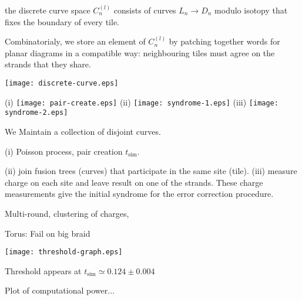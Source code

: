 \documentclass[11pt,a4paper]{article}
\begin{document}
 the discrete curve space $C_n^{(l)}$ consists of
curves $L_n\to D_n$ modulo isotopy that fixes the boundary of
every tile.

Combinatorialy, we store an element of $C_n^{(l)}$ by patching
together words for planar diagrams in a compatible way: 
neighbouring tiles must agree on the strands that they share.

\begin{center}
\texttt{[image: discrete-curve.eps]}
\end{center}



\begin{center}
(i)
\texttt{[image: pair-create.eps]}
\hskip 10pt
(ii)
\texttt{[image: syndrome-1.eps]}
\hskip 10pt
(iii)
\texttt{[image: syndrome-2.eps]}
\end{center}

We Maintain a collection of disjoint curves.

(i) Poisson process, pair creation $t_{\mathrm{sim}}$.

(ii) join fusion trees (curves)
that participate in the same site (tile).
(iii) measure charge on each site and leave result on
one of the strands.
These charge measurements give the initial syndrome for the
error correction procedure.

Multi-round, clustering of charges, \cite{Brell13} \cite{Bravyi13}

Torus:
Fail on big braid



\begin{center}
\texttt{[image: threshold-graph.eps]}
\end{center}

Threshold appears at $t_{\mathrm{sim}}\simeq 0.124 \pm 0.004$

Plot of computational power...



\end{document}
